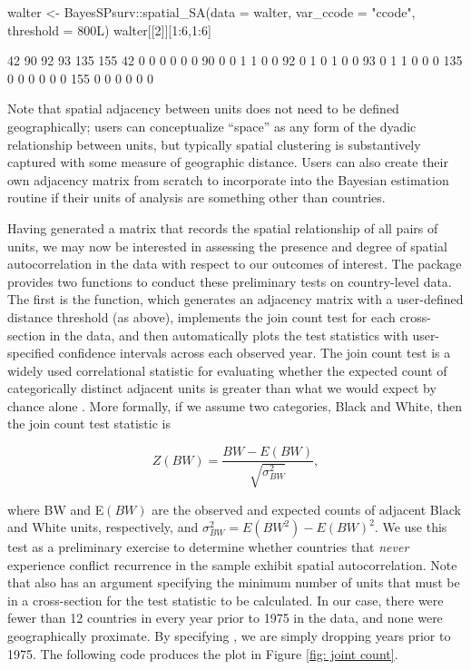 \begin{example}
walter <- BayesSPsurv::spatial_SA(data = walter, var_ccode = "ccode",                                                threshold = 800L)
walter[[2]][1:6,1:6]
  
        42  90  92  93  135  155 
    42  0   0   0   0    0    0     
    90  0   0   1   1    0    0     
    92  0   1   0   1    0    0     
    93  0   1   1   0    0    0     
    135 0   0   0   0    0    0     
    155 0   0   0   0    0    0     
\end{example}


\noindent Note that spatial adjacency between units does not need to be defined geographically; users can conceptualize “space” as any form of the dyadic relationship between units, but typically spatial clustering is substantively captured with some measure of geographic distance. Users can also create their own adjacency matrix from scratch to incorporate into the Bayesian estimation routine if their units of analysis are something other than countries.


Having generated a matrix that records the spatial relationship of all pairs of units, we may now be interested in assessing the presence and degree of spatial autocorrelation in the data with respect to our outcomes of interest. The  package provides two functions to conduct these preliminary tests on country-level data. The first is the  function, which generates an adjacency matrix with a user-defined distance threshold (as above), implements the join count test for each cross-section in the data, and then automatically plots the test statistics with user-specified confidence intervals across each observed year. The join count test is a widely used correlational statistic for evaluating whether the expected count of categorically distinct adjacent units is greater than what we would expect by chance alone \citep{cliff1981spatial}. More formally, if we assume two categories, Black and White, then the join count test statistic is

\begin{equation}
Z\left(BW\right) = \frac{BW-E \left( BW \right) }{\sqrt{\sigma^2_{BW}}},
\end{equation}

\noindent where BW and E$\left(BW\right)$ are the observed and expected counts of adjacent Black and White units, respectively, and $\sigma^2_{BW}= E\left(BW^2\right) - E\left(BW\right)^2$. We use this test as a preliminary exercise to determine whether countries that \emph{never} experience conflict recurrence in the sample exhibit spatial autocorrelation. Note that  also has an argument specifying the minimum number of units that must be in a cross-section for the test statistic to be calculated. In our case, there were fewer than 12 countries in every year prior to 1975 in the data, and none were geographically proximate. By specifying , we are simply dropping years prior to 1975. The following code produces the plot in Figure \ref{fig: joint count}.

